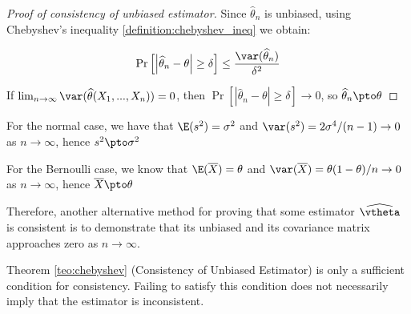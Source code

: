 \begin{proof}[Proof of consistency of unbiased estimator]
  Since $\widehat{\theta}_n$ is unbiased, using Chebyshev's inequality \ref{definition:chebyshev_ineq} we obtain:
  
  \begin{equation*}
    \Pr\left[\left| \widehat{\theta}_n - \theta\right|\geq \delta \right]\leq \frac{\var(\widehat{\theta}_n)}{\delta ^2}
  \end{equation*}
  
  If $\lim_{n\to\infty}\var(\widehat{\theta}(X_1,...,X_n)) = 0$, then $\Pr\left[\left| \widehat{\theta}_n - \theta\right|\geq \delta \right]\to 0$, so $\widehat{\theta}_n\pto \theta$
\end{proof}

\begin{example}
For the normal case, we have that $\E(s^2) = \sigma^2$ and $\var(s^2) = 2\sigma^4 / (n - 1)\to 0$ as $n\to \infty$, hence $s^2\pto \sigma^2$
\end{example}


\begin{example}
For the Bernoulli case, we know that $\E(\overline{X}) = \theta$ and $\var(\overline{X}) = \theta (1- \theta)/ n \to 0$ as $n\to \infty$, hence $\overline{X}\pto \theta$
\end{example}

Therefore, another alternative method for proving that some estimator $\widehat{\vtheta}$ is consistent is to demonstrate that its unbiased and its covariance matrix approaches zero as $n\to\infty$.

\begin{remark}
Theorem \ref{teo:chebyshev} (Consistency of Unbiased Estimator) is only a sufficient condition for consistency. Failing to satisfy this condition does not necessarily imply that the estimator is inconsistent. 
\end{remark}


